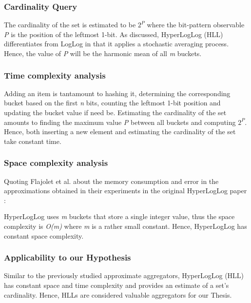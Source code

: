 \subsubsection*{Cardinality Query}
The cardinality of the set is estimated to be $2^\textit{P}$ where the bit-pattern observable \textit{P} is the position of the leftmost 1-bit. As discussed, HyperLogLog (HLL) differentiates from LogLog in that it applies a stochastic averaging process. Hence, the value of \textit{P} will be the harmonic mean of all \textit{m} buckets.


\subsubsection*{Time complexity analysis}
Adding an item is tantamount to hashing it, determining the corresponding bucket based on the first \textit{n} bits, counting the leftmost 1-bit position and updating the bucket value if need be. Estimating the cardinality of the set amounts to finding the maximum value \textit{P} between all buckets and computing $2^P$. Hence, both inserting a new element and estimating the cardinality of the set take constant time.

\subsubsection*{Space complexity analysis}
Quoting Flajolet et al. about the memory consumption and error in the approximations obtained in their experiments in the original HyperLogLog paper \cite{Flajolet-HLL}: 

HyperLogLog uses \textit{m} buckets that store a single integer value, thus the space complexity is \textit{O(m)} where \textit{m} is a rather small constant. Hence, HyperLogLog has constant space complexity.

\subsubsection*{Applicability to our Hypothesis}
Similar to the previously studied approximate aggregators, HyperLogLog (HLL) has constant space and time complexity and provides an estimate of a set's cardinality. Hence, HLLs are considered valuable aggregators for our Thesis.



